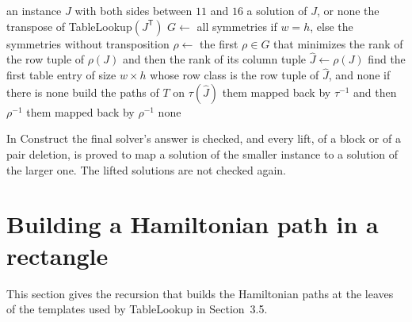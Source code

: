 \documentclass[11pt]{article}
\begin{document}
\begin{algorithm}[H]
\caption{TableLookup$(J)$}\label{alg:lookup}
\begin{algorithmic}[1]
\Require an instance $J$ with both sides between $11$ and $16$
\Ensure a solution of $J$, or none
 \State \Return the transpose of TableLookup$(J^{\mathsf T})$ \EndIf
\State $G\gets$ all symmetries if $w=h$, else the symmetries without transposition
\State $\rho\gets$ the first $\rho\in G$ that minimizes the rank of the row tuple of $\rho(J)$ and
  then the rank of its column tuple
\State $\hat J\gets\rho(J)$
\State find the first table entry of size $w\times h$ whose row class is the row tuple of $\hat J$,
  and \Return none if there is none
    \State build the paths of $T$ on $\tau(\hat J)$ 
    \State \Return them mapped back by $\tau^{-1}$ and then $\rho^{-1}$
  \EndIf
\EndFor
{}
  \State \Return them mapped back by $\rho^{-1}$
\EndIf
\State \Return none
\end{algorithmic}
\end{algorithm}

In Construct the final solver's answer is checked, and every lift, of a block or of a pair
deletion, is proved to map a solution of the smaller instance to a solution of the larger one. The
lifted solutions are not checked again.

\section{Building a Hamiltonian path in a rectangle}\label{sec:ips}

This section gives the recursion that builds the Hamiltonian paths at the leaves of the templates
used by TableLookup in Section~3.5.
\end{document}
